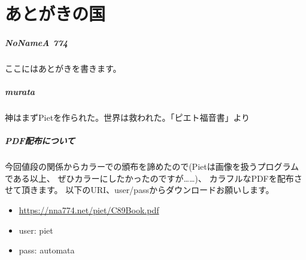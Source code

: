 \chapter[あとがきの国]{あとがきの国}

\paragraph{NoNameA 774}

ここにはあとがきを書きます。

\paragraph{murata}

神はまずPietを作られた。世界は救われた。「ピエト福音書」より

\paragraph{PDF配布について}

今回値段の関係からカラーでの頒布を諦めたので(Pietは画像を扱うプログラムである以上、
ぜひカラーにしたかったのですが……)、
カラフルなPDFを配布させて頂きます。
以下のURI、user/passからダウンロードお願いします。
\begin{itemize}
\item
  \url{https://nna774.net/piet/C89Book.pdf}
\item
  user: piet
\item
  pass: automata
\end{itemize}

